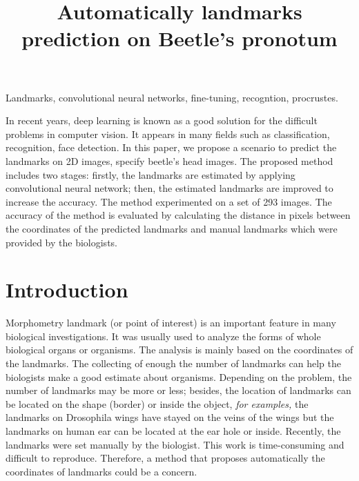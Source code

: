 \documentclass[10pt]{article}
\begin{document}
\noindent



\title{Automatically landmarks prediction on Beetle's pronotum}




\maketitle

\keywords
Landmarks, convolutional neural networks, fine-tuning, recogntion, procrustes.

\abstract
In recent years, deep learning is known as a good solution for the difficult problems in computer vision. It appears in many fields such as classification, recognition, face detection. In this paper, we propose a scenario to predict the landmarks on 2D images, specify beetle's head images. The proposed method includes two stages: firstly, the landmarks are estimated by applying convolutional neural network; then, the estimated landmarks are improved to increase the accuracy. The method experimented on a set of 293 images. The accuracy of the method is evaluated by calculating the distance in pixels between the coordinates of the predicted landmarks and manual landmarks which were provided by the biologists.

\section{Introduction}
Morphometry landmark (or point of interest) is an important feature in many biological investigations. It was usually used to analyze the forms of whole biological organs or organisms. The analysis is mainly based on the coordinates of the landmarks. The collecting of enough the number of landmarks can help the biologists make a good estimate about organisms. Depending on the problem, the number of landmarks may be more or less; besides, the location of landmarks can be located on the shape (border) or inside the object, \textit{for examples,} the landmarks on Drosophila wings have stayed on the veins of the wings but the landmarks on human ear can be located at the ear hole or inside. Recently, the landmarks were set manually by the biologist. This work is time-consuming and difficult to reproduce. Therefore, a method that proposes automatically the coordinates of landmarks could be a concern. 
\end{document}
